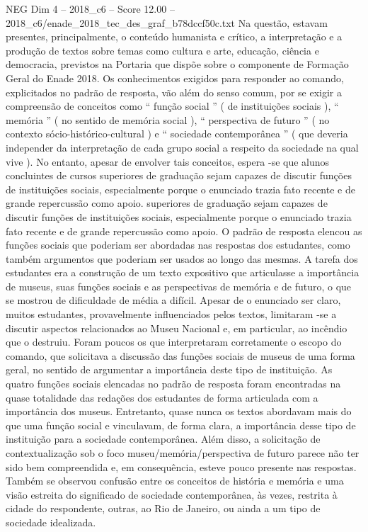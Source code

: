 \begin{textsample}{NEG Dim 4 – 2018\_c6 – Score 12.00 – 2018\_c6/enade\_2018\_tec\_des\_graf\_b78dccf50c.txt}
Na questão, estavam presentes, principalmente, o conteúdo humanista e crítico, a interpretação e a produção de textos sobre temas como cultura e arte, educação, ciência e democracia, previstos na Portaria que dispõe sobre o componente de Formação Geral do Enade 2018.
Os conhecimentos exigidos para responder ao comando, explicitados no padrão de resposta, vão além do senso comum, por se exigir a compreensão de conceitos como “ função social ” ( de instituições sociais ), “ memória ” ( no sentido de memória social ), “ perspectiva de futuro ” ( no contexto sócio-histórico-cultural ) e “ sociedade contemporânea ” ( que deveria independer da interpretação de cada grupo social a respeito da sociedade na qual vive ).
No entanto, apesar de envolver tais conceitos, espera -se que alunos concluintes de cursos superiores de graduação sejam capazes de discutir funções de instituições sociais, especialmente porque o enunciado trazia fato recente e de grande repercussão como apoio. superiores de graduação sejam capazes de discutir funções de instituições sociais, especialmente porque o enunciado trazia fato recente e de grande repercussão como apoio.
O padrão de resposta elencou as funções sociais que poderiam ser abordadas nas respostas dos estudantes, como também argumentos que poderiam ser usados ao longo das mesmas.
A tarefa dos estudantes era a construção de um texto expositivo que articulasse a importância de museus, suas funções sociais e as perspectivas de memória e de futuro, o que se mostrou de dificuldade de média a difícil.
Apesar de o enunciado ser claro, muitos estudantes, provavelmente influenciados pelos textos, limitaram -se a discutir aspectos relacionados ao Museu Nacional e, em particular, ao incêndio que o destruiu.
Foram poucos os que interpretaram corretamente o escopo do comando, que solicitava a discussão das funções sociais de museus de uma forma geral, no sentido de argumentar a importância deste tipo de instituição.
As quatro funções sociais elencadas no padrão de resposta foram encontradas na quase totalidade das redações dos estudantes de forma articulada com a importância dos museus.
Entretanto, quase nunca os textos abordavam mais do que uma função social e vinculavam, de forma clara, a importância desse tipo de instituição para a sociedade contemporânea.
Além disso, a solicitação de contextualização sob o foco museu/memória/perspectiva de futuro parece não ter sido bem compreendida e, em consequência, esteve pouco presente nas respostas.
Também se observou confusão entre os conceitos de história e memória e uma visão estreita do significado de sociedade contemporânea, às vezes, restrita à cidade do respondente, outras, ao Rio de Janeiro, ou ainda a um tipo de sociedade idealizada.

\end{textsample}
